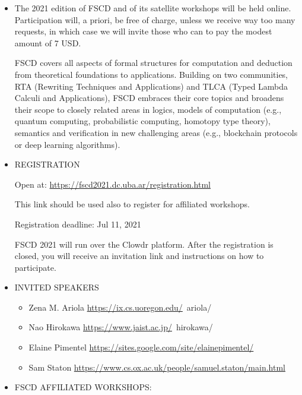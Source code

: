 \documentclass[prodmode,acmtecs]{acmsmall} %
\begin{document}
\begin{itemize}\item  The 2021 edition of FSCD and of its satellite workshops will be held online. Participation will, a priori, be free of charge, unless we receive way too many requests, in which case we will invite those who can to pay the modest amount of 7 USD. 
 
  FSCD covers all aspects of formal structures for computation and deduction from theoretical foundations to applications. Building on two communities, RTA (Rewriting Techniques and Applications) and TLCA (Typed Lambda Calculi and Applications), FSCD embraces their core topics and broadens their scope to closely related areas in logics, models of computation (e.g., quantum computing, probabilistic computing, homotopy type theory), semantics and verification in new challenging areas (e.g., blockchain protocols or deep learning algorithms). 
 
\item  REGISTRATION  
 
  Open at: \href{https://fscd2021.dc.uba.ar/registration.html}{https://fscd2021.dc.uba.ar/registration.html} 
 
  This link should be used also to register for affiliated workshops. 
 
Registration deadline: Jul 11, 2021 
 
  FSCD 2021 will run over the Clowdr platform. After the registration is closed, you will receive an invitation link and instructions on how to participate. 
 
\item  INVITED SPEAKERS   
 
\begin{itemize}\item  Zena M. Ariola \href{https://ix.cs.uoregon.edu/}{https://ix.cs.uoregon.edu/}~ariola/ 
\item  Nao Hirokawa \href{https://www.jaist.ac.jp/}{https://www.jaist.ac.jp/}~hirokawa/ 
\item  Elaine Pimentel \href{https://sites.google.com/site/elainepimentel/}{https://sites.google.com/site/elainepimentel/} 
\item  Sam Staton \href{https://www.cs.ox.ac.uk/people/samuel.staton/main.html}{https://www.cs.ox.ac.uk/people/samuel.staton/main.html}
\end{itemize} 
\item  FSCD AFFILIATED WORKSHOPS:   
 

\end{itemize}
\end{document}
